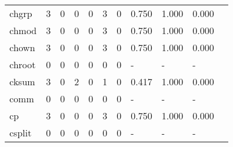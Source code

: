 \begin{longtable}{lp{1.10cm}p{1.10cm}p{1.10cm}p{1.10cm}p{1.10cm}p{1.10cm}p{1.10cm}p{1.10cm}p{1.10cm}p{1.10cm}}
chgrp     &                      3 &                                  0 &                                 0 &                                0 &                                 3 &                               0 &                          0.750 &                                 1.000 &                               0.000 \\
chmod     &                      3 &                                  0 &                                 0 &                                0 &                                 3 &                               0 &                          0.750 &                                 1.000 &                               0.000 \\
chown     &                      3 &                                  0 &                                 0 &                                0 &                                 3 &                               0 &                          0.750 &                                 1.000 &                               0.000 \\
chroot    &                      0 &                                  0 &                                 0 &                                0 &                                 0 &                               0 &                              - &                                     - &                                   - \\
cksum     &                      3 &                                  0 &                                 2 &                                0 &                                 1 &                               0 &                          0.417 &                                 1.000 &                               0.000 \\
comm      &                      0 &                                  0 &                                 0 &                                0 &                                 0 &                               0 &                              - &                                     - &                                   - \\
cp        &                      3 &                                  0 &                                 0 &                                0 &                                 3 &                               0 &                          0.750 &                                 1.000 &                               0.000 \\
csplit    &                      0 &                                  0 &                                 0 &                                0 &                                 0 &                               0 &                              - &                                     - &                                   - \\

\end{longtable}
